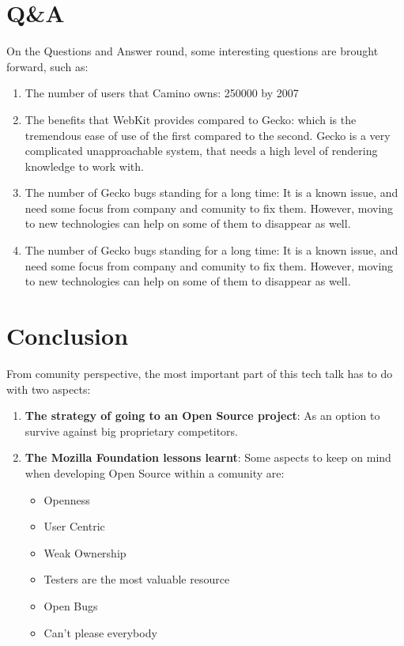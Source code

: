 \documentclass[11pt]{article}
\begin{document}
\section{Q\&A}
On the Questions and Answer round, some interesting questions are brought forward, such as:
\begin{enumerate}\itemsep0pt
\item{The number of users that Camino owns}: 250000 by 2007
\item{The benefits that WebKit provides compared to Gecko}: which is the tremendous ease of use of the first compared to the second. Gecko is a very complicated unapproachable system, that needs a high level of rendering knowledge to work with.
\item{The number of Gecko bugs standing for a long time}: It is a known issue, and need some focus from company and comunity to fix them. However, moving to new technologies can help on some of them to disappear as well.
\item{The number of Gecko bugs standing for a long time}: It is a known issue, and need some focus from company and comunity to fix them. However, moving to new technologies can help on some of them to disappear as well.
\end{enumerate}

\section{Conclusion}
From comunity perspective, the most important part of this tech talk has to do with two aspects:
\begin{enumerate}
\item{\textbf{The strategy of going to an Open Source project}}: As an option to survive against big proprietary competitors.
\item{\textbf{The Mozilla Foundation lessons learnt}}: Some aspects to keep on mind when developing Open Source within a comunity are:
\begin{itemize}
\item{Openness}
\item{User Centric}
\item{Weak Ownership}
\item{Testers are the most valuable resource}
\item{Open Bugs}
\item{Can't please everybody}
\end{itemize}
\end{enumerate}
\end{document}
